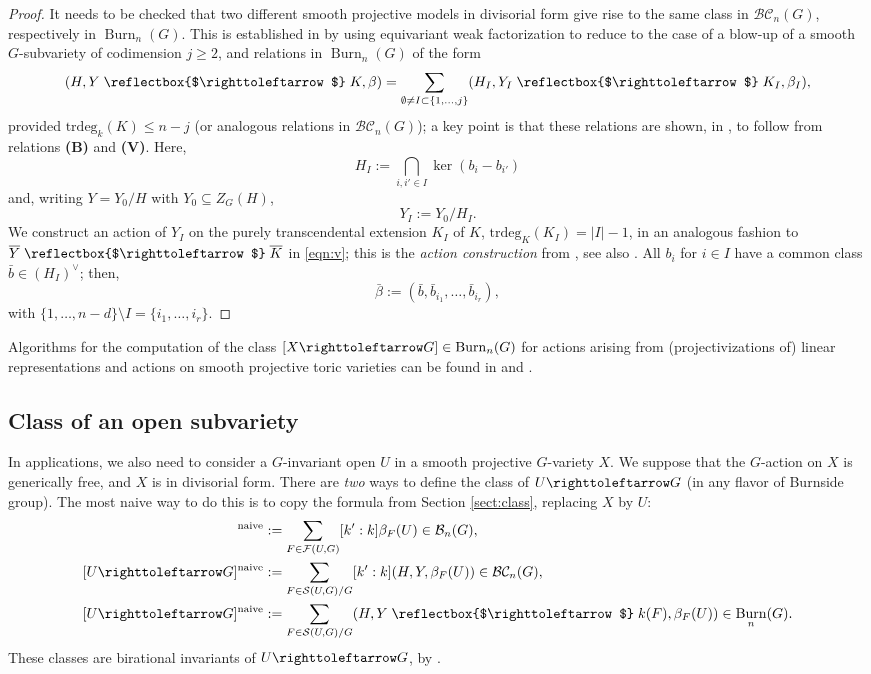 \documentclass[12pt,reqno]{amsart}
\theoremstyle{plain}
\theoremstyle{remark}
\theoremstyle{definition}
\numberwithin{equation}{section}
\newcommand{\cB}{{\mathcal B}}
\newcommand{\cF}{{\mathcal F}}
\newcommand{\cS}{{\mathcal S}}
\newcommand{\BC}{{\mathcal B}{\mathcal C}}
\newcommand{\actsfromleft}{\mathrel{\reflectbox{$\righttoleftarrow$}}}
\newcommand{\actsfromright}{\righttoleftarrow}
\DeclareMathOperator{\Burn}{Burn}
\begin{document}
\begin{proof}
It needs to be checked that two different smooth projective models in divisorial form give rise to the same class in $\BC_n(G)$, respectively in $\Burn_n(G)$.
This is established in \cite[Thm.\ 5.1]{BnG} by using
equivariant weak factorization to reduce to the case of a blow-up of a smooth $G$-subvariety of codimension $j\ge 2$, and relations in $\Burn_n(G)$
of the form
\[
(H,Y\actsfromleft K,\beta)=
\sum_{\emptyset\ne I\subset \{1,\dots,j\}} 
(H_I,Y_I\actsfromleft K_I,\beta_I),
\]
provided $\mathrm{trdeg}_k(K)\le n-j$
(or analogous relations in $\BC_n(G)$);
a key point is that these relations are shown, in \cite[Prop.\ 4.7(ii)]{BnG}, to follow from relations \textbf{(B)} and \textbf{(V)}.
Here,
\[ H_I:=\bigcap_{i,i'\in I}\ker(b_i-b_{i'}) \]
and, writing $Y=Y_0/H$ with $Y_0\subseteq Z_G(H)$,
\[ Y_I:=Y_0/H_I. \]
We construct an action of $Y_I$ on the purely transcendental extension
$K_I$ of $K$, $\mathrm{trdeg}_K(K_I)=|I|-1$,
in an analogous fashion to
$\overline{Y}\actsfromleft \overline{K}$ in \eqref{eqn:v}; this is the {\em action construction} from \cite[Sect.\ 2]{BnG}, see also \cite[Sect.\ 2]{KT-vector}. 
All $b_i$ for $i\in I$ have a common class $\bar b\in (H_I)^\vee$; then,
\[ \bar \beta:=(\bar b,\bar b_{i_1},\dots, \bar b_{i_r}), \]
with $\{1,\dots,n-d\}\setminus I=\{i_1,\dots,i_r\}$.
\end{proof}

Algorithms for the computation of the class $[X\actsfromright G]\in \Burn_n(G)$ for actions arising from (projectivizations of) linear representations and actions on smooth projective toric varieties can be found in \cite{KT-vector} and \cite{KT-toric}. 



\subsection{Class of an open subvariety}
\label{ss.opensubvariety}
In applications, we also need to consider a $G$-invariant open $U$ in a smooth projective $G$-variety $X$.
We suppose that the $G$-action on $X$ is generically free, and $X$ is in divisorial form.
There are \emph{two} ways to define the class of $U\actsfromright G$ (in any flavor of Burnside group).
The most naive way to do this is to copy the formula from Section \ref{sect:class}, replacing $X$ by $U$:
\begin{align*}
[U\actsfromright G]^{\mathrm{naive}}&:=\sum_{F\in \cF(U,G)} [k':k]\beta_{F}(U)\in \cB_n(G), \\
[U\actsfromright G]^{\mathrm{naive}}&:=\sum_{F\in \cS(U,G)/G} [k':k](H, Y, \beta_F(U))\in\BC_n(G), \\
[U\actsfromright G]^{\mathrm{naive}}&:=\sum_{F\in \cS(U,G)/G}  (H, Y\actsfromleft k(F), \beta_F(U))\in\Burn_n(G).
\end{align*}
These classes are birational invariants of $U\actsfromright G$, by \cite[Lemma 5.3]{BnG}.
\end{document}
